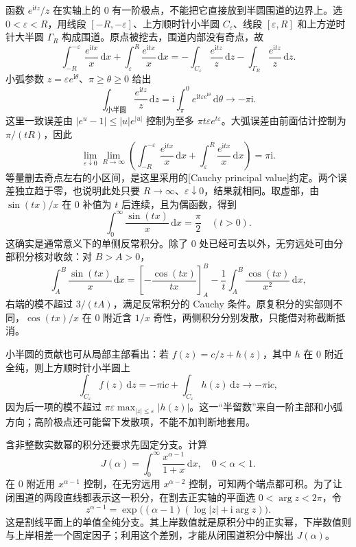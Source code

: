 函数 \(e^{\mathrm{i}tz}/z\) 在实轴上的 \(0\) 有一阶极点，不能把它直接放到半圆围道的边界上。选 \(0<\varepsilon<R\)，用线段 \([-R,-\varepsilon]\)、上方顺时针小半圆 \(C_\varepsilon\)、线段 \([\varepsilon,R]\) 和上方逆时针大半圆 \(\Gamma_R\) 构成围道。原点被挖去，围道内部没有奇点，故
\[
 \int_{-R}^{-\varepsilon}\frac{e^{\mathrm{i}tx}}x\,\mathrm{d}x
 +\int_{\varepsilon}^{R}\frac{e^{\mathrm{i}tx}}x\,\mathrm{d}x
 =-\int_{C_\varepsilon}\frac{e^{\mathrm{i}tz}}z\,\mathrm{d}z
  -\int_{\Gamma_R}\frac{e^{\mathrm{i}tz}}z\,\mathrm{d}z.
\]
小弧参数 \(z=\varepsilon e^{\mathrm{i}\theta}\)、\(\pi\ge\theta\ge0\) 给出
\[
 \int_{\text{小半圆}}\frac{e^{\mathrm{i}tz}}z\,\mathrm{d}z
 =\mathrm{i}\int_\pi^0 e^{\mathrm{i}t\varepsilon e^{\mathrm{i}\theta}}
 \,\mathrm{d}\theta\longrightarrow-\pi\mathrm{i}.
\]
这里一致误差由 \(|e^u-1|\le |u|e^{|u|}\) 控制为至多 \(\pi t\varepsilon e^{t\varepsilon}\)。大弧误差由前面估计控制为 \(\pi/(tR)\)，因此
\[
 \lim_{\varepsilon\downarrow0}\lim_{R\to\infty}
 \left(
  \int_{-R}^{-\varepsilon}\frac{e^{\mathrm{i}tx}}x\,\mathrm{d}x
  +\int_{\varepsilon}^{R}\frac{e^{\mathrm{i}tx}}x\,\mathrm{d}x
 \right)=\pi\mathrm{i}.
\]
等量删去奇点左右的小区间，是这里采用的[Cauchy principal value]约定。两个误差独立趋于零，也说明此处只要 \(R\to\infty\)、\(\varepsilon\downarrow0\)，结果就相同。取虚部，由 \(\sin(tx)/x\) 在 \(0\) 补值为 \(t\) 后连续，且为偶函数，得到
\[
 \int_0^\infty\frac{\sin(tx)}x\,\mathrm{d}x=\frac\pi2
 \quad(t>0).
\]
这确实是通常意义下的单侧反常积分。除了 \(0\) 处已经可去以外，无穷远处可由分部积分核对收敛：对 \(B>A>0\)，
\[
 \int_A^B\frac{\sin(tx)}x\,\mathrm{d}x
 =\left[-\frac{\cos(tx)}{tx}\right]_A^B
   -\frac1t\int_A^B\frac{\cos(tx)}{x^2}\,\mathrm{d}x,
\]
右端的模不超过 \(3/(tA)\)，满足反常积分的 Cauchy 条件。原复积分的实部则不同，\(\cos(tx)/x\) 在 \(0\) 附近含 \(1/x\) 奇性，两侧积分分别发散，只能借对称截断抵消。

\ProseParagraphBreak

小半圆的贡献也可从局部主部看出：若 \(f(z)=c/z+h(z)\)，其中 \(h\) 在 \(0\) 附近全纯，则上方顺时针小半圆上
\[
 \int_{C_\varepsilon}f(z)\,\mathrm{d}z
 =-\pi\mathrm{i}c+\int_{C_\varepsilon}h(z)\,\mathrm{d}z
 \longrightarrow-\pi\mathrm{i}c,
\]
因为后一项的模不超过 \(\pi\varepsilon\max_{|z|\le\varepsilon}|h(z)|\)。这一“半留数”来自一阶主部和小弧方向；高阶极点还可能留下发散项，不能不加判断地套用。

\ProseParagraphBreak

含非整数实数幂的积分还要求先固定分支。计算
\[
 J(\alpha)=\int_0^\infty\frac{x^{\alpha-1}}{1+x}\,\mathrm{d}x,
 \quad 0<\alpha<1.
\]
在 \(0\) 附近用 \(x^{\alpha-1}\) 控制，在无穷远用 \(x^{\alpha-2}\) 控制，可知两个端点都可积。为了让闭围道的两段直线都表示这一积分，在割去正实轴的平面选 \(0<\arg z<2\pi\)，令
\[
 z^{\alpha-1}
 =\exp\bigl((\alpha-1)(\log|z|+\mathrm{i}\arg z)\bigr).
\]
这是割线平面上的单值全纯分支。其上岸数值就是原积分中的正实幂，下岸数值则与上岸相差一个固定因子；利用这个差别，才能从闭围道积分中解出 \(J(\alpha)\)。

